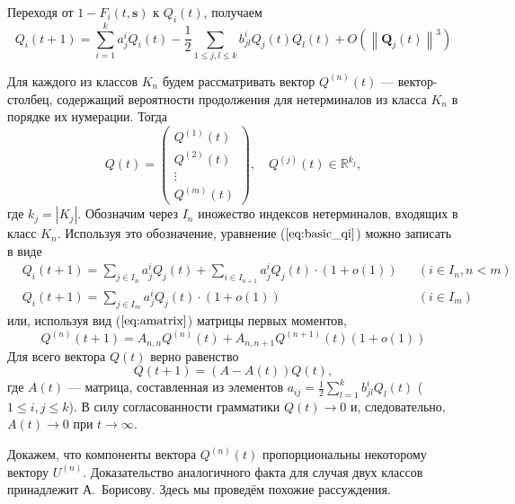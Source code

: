 \documentclass[12pt]{article}
\renewcommand{\leq}{\leqslant}
\begin{document}
{Переходя от $1 - F_i(t, \mathbf{s})$ к $Q_i(t)$, получаем
\begin{equation}
\label{eq:basic_qi}
	Q_i(t+1) = \sum_{i = 1}^k a^i_j Q_i(t) - \frac{1}{2} \sum_{1 \leq j,l \leq k} b^i_{jl} Q_j(t) Q_l(t) + O \left( \left\| \mathbf{Q}_j(t) \right\|^3 \right)
\end{equation}

Для каждого из классов $K_n$ будем рассматривать вектор $Q^{(n)}(t)$ --- вектор-столбец, содержащий вероятности продолжения для нетерминалов из класса $K_n$ в порядке их нумерации. Тогда
\begin{equation}
	Q(t) =
	\begin{pmatrix}
		Q^{(1)}(t) \\
		Q^{(2)}(t) \\
		\vdots \\
		Q^{(m)}(t)
	\end{pmatrix},
	\quad Q^{(j)}(t) \in \mathbb{R}^{k_j},
\end{equation}
где $k_j = \left| K_j \right|$. Обозначим через $I_n$ иножество индексов нетерминалов, входящих в класс $K_n$. Используя это обозначение, уравнение ($\ref{eq:basic_qi}$) можно записать в виде
\begin{align}
	&Q_i(t+1) = \sum_{j \in I_n} a^i_j Q_j(t) + \sum_{i \in I_{n+1}} a^i_j Q_j(t) \cdot (1 + o(1)) & &(i \in I_n, n < m) \\
	&Q_i(t+1) = \sum_{j \in I_m} a^i_j Q_j(t) \cdot (1 + o(1)) & &(i \in I_m)
\end{align}
или, используя вид ($\ref{eq:amatrix}$) матрицы первых моментов,
\begin{equation}
	Q^{(n)}(t+1) = A_{n,n} Q^{(n)}(t) + A_{n,n+1} Q^{(n+1)}(t) (1 + o(1))
\end{equation}
Для всего вектора $Q(t)$ верно равенство
\begin{equation}
\label{eq:q_t+1_from_q_t}
	Q(t+1) = (A - A(t)) Q(t),
\end{equation}
где $A(t)$ --- матрица, составленная из элементов $a_{ij} = \frac{1}{2} \sum_{l = 1}^k b^i_{jl} Q_l(t)$ ($1 \leq i,j \leq k$). В силу согласованности грамматики $Q(t) \rightarrow 0$ и, следовательно, $A(t) \rightarrow 0$ при $t \rightarrow \infty$.

Докажем, что компоненты вектора $Q^{(n)}(t)$ пропорциональны некоторому вектору $U^{(n)}$. Доказательство аналогичного факта для случая двух классов принадлежит А.~Борисову. Здесь мы проведём похожие рассуждения.

}
\end{document}
